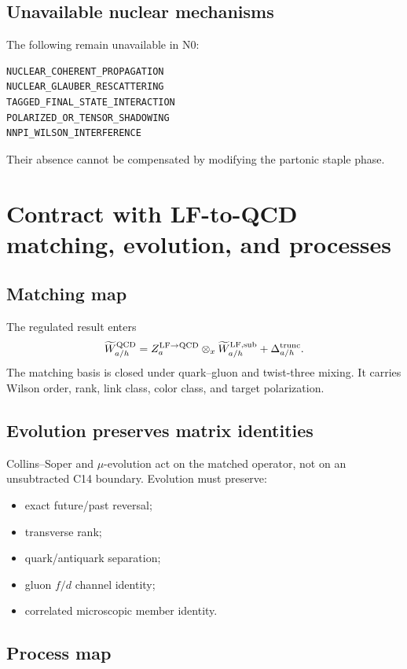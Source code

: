 \documentclass[11pt]{article}
\newcommand{\LF}{\ensuremath{\mathrm{LF}}}
\newcommand{\QCD}{\ensuremath{\mathrm{QCD}}}
\newcommand{\trunc}{\mathrm{trunc}}
\begin{document}
\subsection{Unavailable nuclear mechanisms}

The following remain unavailable in N0:
\begin{verbatim}
NUCLEAR_COHERENT_PROPAGATION
NUCLEAR_GLAUBER_RESCATTERING
TAGGED_FINAL_STATE_INTERACTION
POLARIZED_OR_TENSOR_SHADOWING
NNPI_WILSON_INTERFERENCE
\end{verbatim}
Their absence cannot be compensated by modifying the partonic staple phase.

\section{Contract with LF-to-QCD matching, evolution, and processes}
\label{sec:qcd-contract}

\subsection{Matching map}

The regulated result enters
\begin{equation}
 \widetilde W_{a/h}^{\QCD}
 =Z_{a}^{\LF\to\QCD}
 \otimes_x
 \widetilde W_{a/h}^{\LF,\rm sub}
 +\Delta_{a/h}^{\trunc}.
 \label{eq:lf-qcd-match}
\end{equation}
The matching basis is closed under quark--gluon and twist-three mixing.  It
carries Wilson order, rank, link class, color class, and target polarization.

\subsection{Evolution preserves matrix identities}

Collins--Soper and \(\mu\)-evolution act on the matched operator, not on an
unsubtracted C14 boundary.  Evolution must preserve:
\begin{itemize}
 \item exact future/past reversal;
 \item transverse rank;
 \item quark/antiquark separation;
 \item gluon \(f/d\) channel identity;
 \item correlated microscopic member identity.
\end{itemize}

\subsection{Process map}
\end{document}
